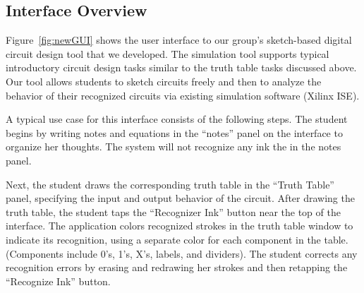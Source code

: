 \documentclass{elsart}
\begin{document}
\subsection{Interface Overview}
%


Figure~\ref{fig:newGUI} shows the user interface to our group's
sketch-based digital circuit design tool that we developed. The simulation tool
supports typical introductory circuit design tasks similar to the
truth table tasks discussed above.  Our tool allows
students to sketch circuits freely and then to analyze the behavior of
their recognized circuits via existing simulation software (Xilinx
ISE).  

A typical use case for this interface consists of the following steps.
The student begins by writing notes and equations in the ``notes''
panel on the interface to organize her thoughts.  The system will not
recognize any ink the in the notes panel.

Next, the student draws the corresponding truth table in the ``Truth
Table'' panel, specifying the input and output behavior of the
circuit.  After drawing the truth table, the student taps the
``Recognizer Ink'' button near the top of the interface.  The
application colors recognized strokes in the truth table window to
indicate its recognition, using a separate color for each component in
the table.  (Components include 0's, 1's, X's, labels, and dividers).
The student corrects any recognition errors by erasing and redrawing
her strokes and then retapping the ``Recognize Ink'' button.
\end{document}
